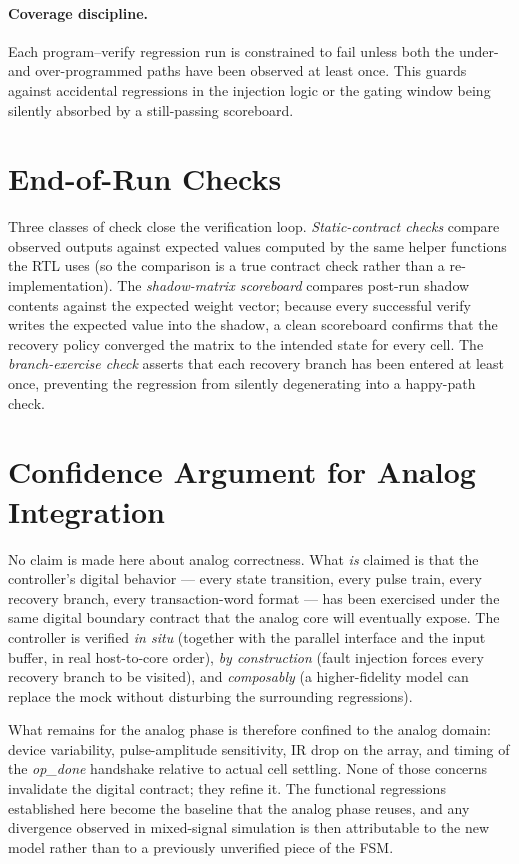 \paragraph{Coverage discipline.}
Each program--verify regression run is constrained to fail unless both
the under- and over-programmed paths have been observed at least once.
This guards against accidental regressions in the injection logic or the
gating window being silently absorbed by a still-passing scoreboard.

\section{End-of-Run Checks}
\label{sec:verif-loop}

Three classes of check close the verification loop. \emph{Static-contract
checks} compare observed outputs against expected values computed by the
same helper functions the RTL uses (so the comparison is a true contract
check rather than a re-implementation). The \emph{shadow-matrix
scoreboard} compares post-run shadow contents against the expected
weight vector; because every successful verify writes the expected value
into the shadow, a clean scoreboard confirms that the recovery policy
converged the matrix to the intended state for every cell. The
\emph{branch-exercise check} asserts that each recovery branch has been
entered at least once, preventing the regression from silently
degenerating into a happy-path check.

\section{Confidence Argument for Analog Integration}
\label{sec:verif-confidence-future}

No claim is made here about analog correctness. What \emph{is} claimed
is that the controller's digital behavior --- every state transition,
every pulse train, every recovery branch, every transaction-word
format --- has been exercised under the same digital boundary contract
that the analog core will eventually expose. The controller is verified
\emph{in situ} (together with the parallel interface and the input
buffer, in real host-to-core order), \emph{by construction} (fault
injection forces every recovery branch to be visited), and
\emph{composably} (a higher-fidelity model can replace the mock without
disturbing the surrounding regressions).

What remains for the analog phase is therefore confined to the analog
domain: device variability, pulse-amplitude sensitivity, IR drop on the
array, and timing of the \emph{op\_done} handshake relative to actual
cell settling. None of those concerns invalidate the digital contract;
they refine it. The functional regressions established here become the
baseline that the analog phase reuses, and any divergence observed in
mixed-signal simulation is then attributable to the new model rather
than to a previously unverified piece of the FSM.
